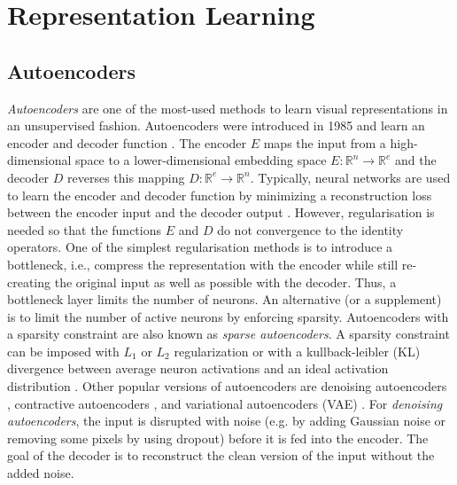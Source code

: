 \section{Representation Learning}

\subsection{Autoencoders}
\emph{Autoencoders} are one of the most-used methods to learn visual representations in an unsupervised fashion.
Autoencoders were introduced in 1985  and learn an encoder and decoder function .
The encoder $E$ maps the input from a high-dimensional space to a lower-dimensional embedding space $E: \mathbb{R}^{n} \rightarrow \mathbb{R}^{e}$ and the decoder $D$ reverses this mapping $D: \mathbb{R}^{e} \rightarrow \mathbb{R}^{n}$.
Typically, neural networks are used to learn the encoder and decoder function by minimizing a reconstruction loss between the encoder input and the decoder output .
However, regularisation is needed so that the functions $E$ and $D$ do not convergence to the identity operators.
One of the simplest regularisation methods is to introduce a bottleneck, i.e., compress the representation with the encoder while still re-creating the original input as well as possible with the decoder.
Thus, a bottleneck layer limits the number of neurons.
An alternative (or a supplement) is to limit the number of active neurons by enforcing sparsity.
Autoencoders with a sparsity constraint are also known as \emph{sparse autoencoders}.
A sparsity constraint can be imposed with $L_1$ or $L_2$ regularization or with a kullback-leibler (KL) divergence between average neuron activations and an ideal activation distribution .
Other popular versions of autoencoders are denoising autoencoders , contractive autoencoders , and variational autoencoders (VAE) .
For \emph{denoising autoencoders}, the input is disrupted with noise (e.g. by adding Gaussian noise or removing some pixels by using dropout) before it is fed into the encoder.
The goal of the decoder is to reconstruct the clean version of the input without the added noise.
